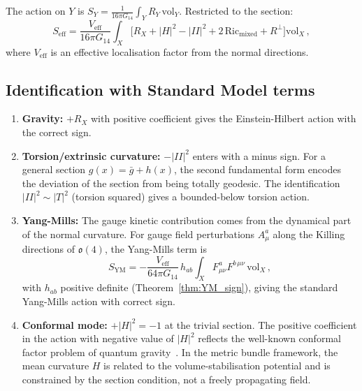 \documentclass[12pt,a4paper]{article}
\theoremstyle{definition}
\begin{document}
The action on $Y$ is $S_Y = \frac{1}{16\pi G_{14}} \int_Y R_Y\, \mathrm{vol}_Y$.
Restricted to the section:
\begin{equation}
S_{\mathrm{eff}} = \frac{V_{\mathrm{eff}}}{16\pi G_{14}} \int_X \Big[ R_X + |H|^2 - |II|^2 + 2\,\mathrm{Ric}_{\mathrm{mixed}} + R^\perp \Big] \mathrm{vol}_X\,,
\end{equation}
where $V_{\mathrm{eff}}$ is an effective localisation factor from the normal directions.

\subsection{Identification with Standard Model terms}

\begin{enumerate}
\item \textbf{Gravity:} $+R_X$ with positive coefficient gives the Einstein-Hilbert action with the correct sign.

\item \textbf{Torsion/extrinsic curvature:} $-|II|^2$ enters with a minus sign.
For a general section $g(x) = \bar{g} + h(x)$, the second fundamental form encodes the deviation of the section from being totally geodesic.
The identification $|II|^2 \sim |T|^2$ (torsion squared) gives a bounded-below torsion action.

\item \textbf{Yang-Mills:} The gauge kinetic contribution comes from the dynamical part of the normal curvature.
For gauge field perturbations $A^a_\mu$ along the Killing directions of $\mathfrak{o}(4)$, the Yang-Mills term is
\begin{equation}
S_{\mathrm{YM}} = -\frac{V_{\mathrm{eff}}}{64\pi G_{14}}\, h_{ab} \int_X F^a_{\mu\nu} F^{b\,\mu\nu}\, \mathrm{vol}_X\,,
\end{equation}
with $h_{ab}$ positive definite (Theorem~\ref{thm:YM_sign}), giving the standard Yang-Mills action with correct sign.

\item \textbf{Conformal mode:} $+|H|^2 = -1$ at the trivial section.
The positive coefficient in the action with negative value of $|H|^2$ reflects the well-known conformal factor problem of quantum gravity~\cite{Giulini2009}.
In the metric bundle framework, the mean curvature $H$ is related to the volume-stabilisation potential and is constrained by the section condition, not a freely propagating field.
\end{enumerate}
\end{document}
